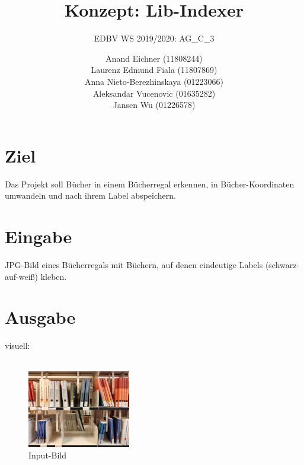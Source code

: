 \documentclass[deutsch]{scrartcl}
\begin{document}
\title{Konzept: Lib-Indexer} %

\subtitle{EDBV WS 2019/2020: AG\_C\_3} %


\author{Anand Eichner (11808244)\\
Laurenz Edmund Fiala (11807869)\\
Anna Nieto-Berezhinskaya (01223066)\\
Aleksandar Vucenovic (01635282)\\
Jansen Wu (01226578)}




\maketitle



\section{Ziel}
Das Projekt soll Bücher in einem Bücherregal erkennen, in Bücher-Koordinaten umwandeln und nach ihrem Label abspeichern.

\section{Eingabe}
JPG-Bild eines Bücherregals mit Büchern, auf denen eindeutige Labels (schwarz-auf-weiß) kleben.

\section{Ausgabe}
visuell:\\
\\
\begin{figure}[H]
 \centering
 \includegraphics[width=0.4\textwidth]{input.jpg}
 \caption{Input-Bild}
 \label{fig:img}
\end{figure}
\end{document}
